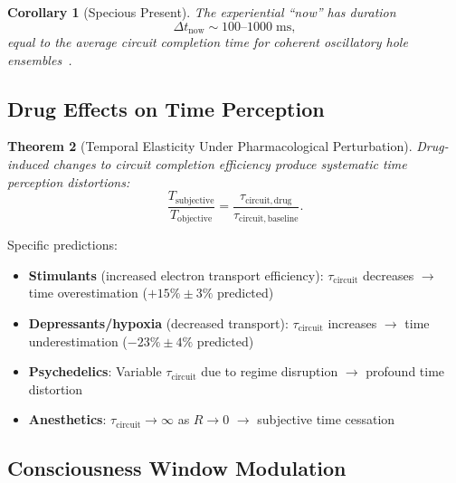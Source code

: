 \documentclass[twocolumn,10pt]{article}
\newtheorem{theorem}{Theorem}[section]
\newtheorem{corollary}[theorem]{Corollary}
\theoremstyle{remark}
\newcommand{\Rorder}{R}
\begin{document}
\begin{corollary}[Specious Present]
The experiential ``now'' has duration
\begin{equation}
  \Delta t_{\mathrm{now}} \sim 100\text{--}1000\;\mathrm{ms},
\end{equation}
equal to the average circuit completion time for coherent oscillatory hole ensembles~\citep{poppel1997temporal,buhusi2005time}.
\end{corollary}

\subsection{Drug Effects on Time Perception}

\begin{theorem}[Temporal Elasticity Under Pharmacological Perturbation]
\label{thm:temporal_elasticity}
Drug-induced changes to circuit completion efficiency produce systematic time perception distortions:
\begin{equation}
  \frac{T_{\mathrm{subjective}}}{T_{\mathrm{objective}}} = \frac{\tau_{\mathrm{circuit, drug}}}{\tau_{\mathrm{circuit, baseline}}}.
\end{equation}
\end{theorem}

Specific predictions:
\begin{itemize}[nosep]
  \item \textbf{Stimulants} (increased electron transport efficiency): $\tau_{\mathrm{circuit}}$ decreases $\to$ time overestimation ($+15\% \pm 3\%$ predicted)
  \item \textbf{Depressants/hypoxia} (decreased transport): $\tau_{\mathrm{circuit}}$ increases $\to$ time underestimation ($-23\% \pm 4\%$ predicted)
  \item \textbf{Psychedelics}: Variable $\tau_{\mathrm{circuit}}$ due to regime disruption $\to$ profound time distortion~\citep{carhart2016neural}
  \item \textbf{Anesthetics}: $\tau_{\mathrm{circuit}} \to \infty$ as $\Rorder \to 0$ $\to$ subjective time cessation~\citep{alkire2008consciousness}
\end{itemize}

\subsection{Consciousness Window Modulation}
\end{document}
